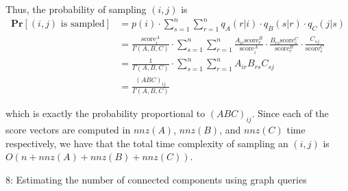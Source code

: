 \documentclass[12pt]{article}
\begin{document}
\begin{solution}
Thus, the probability of sampling $(i, j)$ is
\begin{align*}
    \textbf{Pr}[(i,j) \text{ is sampled}] &= p(i) \cdot \sum\limits_{s=1}^n \sum\limits_{r=1}^n q_A(r|i) \cdot q_B(s|r) \cdot q_C(j|s) \\
    &= \frac{\text{score}_i^A}{\Gamma(A,B,C)} \cdot \sum\limits_{s=1}^n \sum\limits_{r=1}^n \frac{A_{ir}\text{score}_r^B}{\text{score}_i^A} \cdot \frac{B_{rs}\text{score}_s^C}{\text{score}_r^B} \cdot \frac{C_{sj}}{\text{score}_s^C} \\
    &= \frac{1}{\Gamma(A,B,C)} \cdot \sum\limits_{s=1}^n \sum\limits_{r=1}^n A_{ir}B_{rs}C_{sj} \\
    &= \frac{(ABC)_{ij}}{\Gamma(A,B,C)}
\end{align*}

which is exactly the probability proportional to $(ABC)_{ij}$. Since each of the score vectors are computed in $nnz(A)$, $nnz(B)$, and $nnz(C)$ time respectively, we have that the total time complexity of sampling an $(i,j)$ is $O(n + nnz(A) + nnz(B) + nnz(C))$.
\end{solution}

\begin{problem}{8: Estimating the number of connected components using graph queries}
\end{problem}
\end{document}
